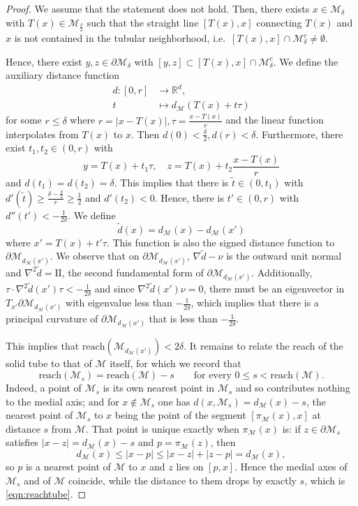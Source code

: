 \documentclass[11pt]{amsart}%
\theoremstyle{plain}
\newcommand{\1}{\mathbf{1}}
\newcommand{\M}{\mathcal{M}}
\newcommand{\II}{\mathrm{I\!I}}   %
\begin{document}
\begin{proof}
    We assume that the statement does not hold. Then, there exists $x\in \M_\delta$ with $T(x)\in \M_\frac{\delta}{2}$ such that the straight line $[T(x),x]$ connecting $T(x)$ and $x$ is not contained in the tubular neighborhood, i.e.\ $[T(x),x]\cap \M_\delta^c\neq \emptyset$.

    Hence, there exist $y,z\in \partial \M_\delta$ with $[y,z]\subset [T(x),x]\cap \M_\delta^c$. We define the auxiliary distance function
    \begin{align*}
        d:[0, r]&\to \mathbb{R}^d,\\
        t&\mapsto d_\M(T(x)+t\tau)
    \end{align*} for some $r\leq \delta$ where $r=|x-T(x)|, \tau=\frac{x-T(x)}{r}$ and the linear function interpolates from $T(x)$ to $x$. Then $d(0)<\frac{\delta}{2}, d(r)<\delta$. Furthermore, there exist $t_1,t_2\in (0,r)$ with 
    $$y=T(x)+t_1\tau,\quad z=T(x)+t_2\frac{x-T(x)}{r}$$
    and $d(t_1)=d(t_2)=\delta$. This implies that there is $\widetilde t\in (0,t_1)$ with $d'(\widetilde t)\geq\frac{\delta-\frac{\delta}{2}}{r}\geq \frac{1}{2}$ and $d'(t_2)<0$.
    Hence, there is $t'\in (0,r)$ with $d''(t')<-\frac{1}{2\delta}$. 
    We define 
    $$\widetilde d(x)=d_\M(x)-d_\M(x')$$ 
    where $x'=T(x)+t'\tau$. This function is also the signed distance function to $\partial \M_{d_\M(x')}$. We observe that on $\partial \M_{d_\M(x')}$, $\nabla \widetilde d-\nu$ is the outward unit normal and $\nabla^2 \widetilde d=\II$, the second fundamental form of $\partial \M_{d_\M(x')}$. Additionally, $\tau\cdot \nabla^2 \widetilde d(x')\tau<-\frac{1}{2\delta}$ and since $\nabla^2 \widetilde d(x')\nu=0$, there must be an eigenvector in $T_{x'}\partial \M_{d_\M(x')}$ with eigenvalue less than $-\frac{1}{2\delta}$, which implies that there is a principal curvature of $\partial \M_{d_\M(x')}$ that is less than $-\frac{1}{2\delta}$.

    This implies that $\text{reach}(\M_{d_\M(x')})<2\delta$. It remains to relate the reach of the
    solid tube to that of $\M$ itself, for which we record that
    \begin{equation}\label{eqn:reachtube}
        \text{reach}(\M_s)=\text{reach}(\M)-s \qquad \text{for every } 0\le s<\text{reach}(\M).
    \end{equation}
    Indeed, a point of $\M_s$ is its own nearest point in $\M_s$ and so contributes nothing to the
    medial axis; and for $x\notin \M_s$ one has $d(x,\M_s)=d_\M(x)-s$, the nearest point of $\M_s$ to
    $x$ being the point of the segment $[\pi_\M(x),x]$ at distance $s$ from $\M$. That point is
    unique exactly when $\pi_\M(x)$ is: if $z\in\partial \M_s$ satisfies $|x-z|=d_\M(x)-s$ and
    $p=\pi_\M(z)$, then 
    $$d_\M(x)\le|x-p|\le|x-z|+|z-p|=d_\M(x),$$
    so $p$ is a nearest point of $\M$ to
    $x$ and $z$ lies on $[p,x]$. Hence the medial axes of $\M_s$ and of $\M$ coincide, while the
    distance to them drops by exactly $s$, which is \eqref{eqn:reachtube}.


\end{proof}
\end{document}
